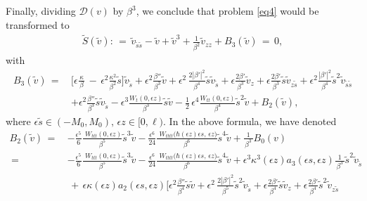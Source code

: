 \documentclass[10pt, reqno]{amsart}
\numberwithin{equation}{section}
\theoremstyle{definition}
\begin{document}
{\medskip
Finally, dividing ${\mathcal D}(v)$ by $\beta^3$, we conclude that problem \eqref{eq4} would be transformed to
\begin{align} \label{eq5}
{\tilde S}({\tilde v}) :\,=\, {\tilde v}_{{\tilde s}{\tilde s}} - {\tilde v}+{\tilde v}^3 +\frac{1}{\beta^2} {\tilde v}_{zz} + B_3({\tilde v}) \,=\, 0,
\end{align}
with
\begin{align*}
B_3({\tilde v})\,=\,
& \Bigg[\epsilon \frac{\kappa}{\, \beta\, }
\,-\, \epsilon^2\frac{\kappa^2}{\beta^2} {\tilde s}\Bigg] {\tilde v}_{\tilde s}
+\epsilon^2\frac{\beta''} {\beta^3}{\tilde v}
+ \epsilon^2\, \frac{2|\beta'|^2}{\beta^4} {\tilde s} {\tilde v}_{\tilde s}
+\epsilon \frac{2\beta'} {\beta^3}{\tilde v}_z
+ \epsilon \frac{2\beta'}{\beta^3} {\tilde s} {\tilde v}_{z{\tilde s}}
+ \epsilon^2 \frac{|\beta'|^2}{\beta^4}{\tilde s}^2 {\tilde v}_{{\tilde s}{\tilde s}}
\nonumber\\[2mm]
&
+ \epsilon^2 \frac{\beta''}{\beta^3} {\tilde s} {\tilde v}_{\tilde s}
- \epsilon^3 \frac{W_t(0, \epsilon z)}{\beta^3} {\tilde s} {\tilde v}
-\frac{1}{2}\, \epsilon^4\frac{W_{tt}(0, \epsilon z)}{\beta^4} {\tilde s}^2 {\tilde v}
+ B_2 ({\tilde v}),
\end{align*}
where $\epsilon {\tilde s}\in(-M_0, M_0),\, \epsilon z\in [0, \ell)$.
In the above formula, we have denoted
\begin{align} \label{B2w}
B_2 ({\tilde v}) \,=\,&
 - \frac{\epsilon^5}{6} \frac{\, \, W_{ttt}(0, \epsilon z)}{\beta^5} {\tilde s}^3{\tilde v}
 -\frac{\epsilon^6}{24} \frac{\, \, W_{tttt}\big(\hbar(\epsilon z)\epsilon s, \, \epsilon z\big)}{\beta^6} {\tilde s}^4{\tilde v}
 + \frac{1}{\, \beta^3\, }B_0 (v)
\nonumber\\[2mm]
 \,=\, &
 - \frac{\epsilon^5}{6} \frac{\, \, W_{ttt}(0, \epsilon z)}{\beta^5} {\tilde s}^3{\tilde v}
 -\frac{\epsilon^6}{24} \frac{\, \, W_{tttt}\big(\hbar(\epsilon z)\epsilon s, \, \epsilon z\big)}{\beta^6} {\tilde s}^4{\tilde v}
+\epsilon^3 \kappa^3(\epsilon z) a_3(\epsilon s, \epsilon z) \frac{1}{\, \beta^3\, }{\tilde s}^2{\tilde v}_{\tilde s}
\nonumber\\[2mm]
&\,+\,
\epsilon \kappa(\epsilon z) a_2(\epsilon s, \epsilon z)
\Bigg[
\epsilon^2\frac{\beta''} {\beta^4} {\tilde s} {\tilde v}
+ \epsilon^2\,\frac{2|\beta'|^2}{\beta^5} {\tilde s}^2 {\tilde v}_{\tilde s}
+\epsilon \frac{2\beta'} {\beta^4} {\tilde s}{\tilde v}_z
+ \epsilon \frac{2\beta'}{\beta^4} {\tilde s}^2 {\tilde v}_{z{\tilde s}}
\nonumber\\[2mm]
&\qquad\qquad\qquad\qquad\qquad

\end{align}}
\end{document}
